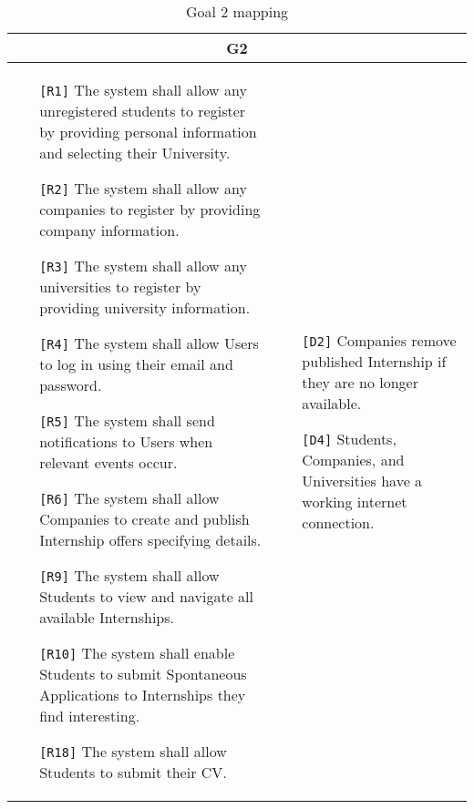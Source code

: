 \begin{table}[H]
 \centering
 \begin{tabular}{|p{8cm}|p{8cm}|}
  \hline
  \multicolumn{2}{|c|}{G2} \\
  \hline
  \begin{itemize}
   \item[\texttt{[R1]}] The system shall allow any unregistered students to register by providing personal information and selecting their University.
   \item[\texttt{[R2]}] The system shall allow any companies to register by providing company information.
   \item[\texttt{[R3]}] The system shall allow any universities to register by providing university information.
   \item[\texttt{[R4]}] The system shall allow Users to log in using their email and password.
   \item[\texttt{[R5]}] The system shall send notifications to Users when relevant events occur.
   \item[\texttt{[R6]}] The system shall allow Companies to create and publish Internship offers specifying details.
   \item[\texttt{[R9]}] The system shall allow Students to view and navigate all available Internships.
   \item[\texttt{[R10]}] The system shall enable Students to submit Spontaneous Applications to Internships they find interesting.
   \item[\texttt{[R18]}] The system shall allow Students to submit their CV.

  \end{itemize} &
  \begin{itemize}
   \item[\texttt{[D2]}] Companies remove published Internship if they are no longer available.
   \item[\texttt{[D4]}] Students, Companies, and Universities have a working internet connection.
  \end{itemize} \\ \hline
 \end{tabular}
 \caption{Goal 2 mapping}
 \label{tab:G2}
\end{table}

